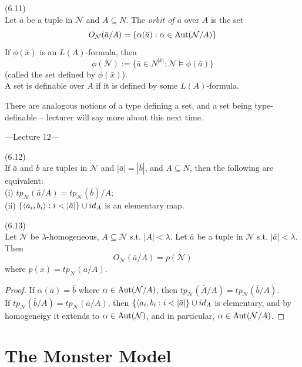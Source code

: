 \documentclass[a4paper]{article}
\begin{document}
\begin{defi} (6.11)\\
    Let $\bar{a}$ be a tuple in $\mathcal{N}$ and $A \subseteq N$. The \emph{orbit of $\bar{a}$} over $A$ is the set
    $$O_\mathcal{N} (\bar{a}/A) = \{\alpha(\bar{a}):\alpha \in \operatorname{Aut}(\mathcal{N}/A)\}$$
    If $\phi(\bar{x})$ is an $L(A)$-formula, then
    $$\phi(\mathcal{N}) := \{\bar{a} \in N^{|\bar{x}|}:\mathcal{N} \vDash \phi(\bar{a})\}$$
    (called the set defined by $\phi(\bar{x})$).\\
    A set is definable over $A$ if it is defined by some $L(A)$-formula.
\end{defi}

There are analogous notions of a type defining a set, and a set being type-definable -- lecturer will say more about this next time.

---Lecture 12---

\begin{rem} (6.12)\\
    If $\bar{a}$ and $\bar{b}$ are tuples in $\mathcal{N}$ and $|\bar{a}| = |\bar{b}|$, and $A \subseteq N$, then the following are equivalent:\\
    (i) $tp_\mathcal{N}(\bar{a}/A) = tp_\mathcal{N}(\bar{b})/A$;\\
    (ii) $\{\bra a_i,b_i\ket : i<|\bar{a}|\} \cup id_A$ is an elementary map.
\end{rem}

\begin{prop} (6.13)\\
    Let $\mathcal{N}$ be $\lambda$-homogeneous, $A \subseteq \mathcal{N}$ s.t. $|A| < \lambda$. Let $\bar{a}$ be a tuple in $\mathcal{N}$ s.t. $|\bar{a}| < \lambda$. Then
    $$O_\mathcal{N} (\bar{a}/A) = p(\mathcal{N})$$
    where $p(\bar{x}) = tp_\mathcal{N}(\bar{a}/A)$.
    \begin{proof}
        If $\alpha(\bar{a}) = \bar{b}$ where $\alpha \in \operatorname{Aut}(\mathcal{N} /A)$, then $tp_\mathcal{N}(\bar{A}/A) = tp_\mathcal{N}(\bar{b}/A)$.\\
        If $tp_\mathcal{N}(\bar{b}/A) = tp_\mathcal{N}(\bar{a}/A)$, then $\{\langle a_i,b_i:i < |\bar{a}| \} \cup id_A$ is elementary, and by homogeneigy it extends to $\alpha \in \operatorname{Aut}(\mathcal{N})$, and in particular, $\alpha \in \operatorname{Aut} (\mathcal{N} / A)$.
    \end{proof}
\end{prop}

\newpage

\section{The Monster Model}
\end{document}
